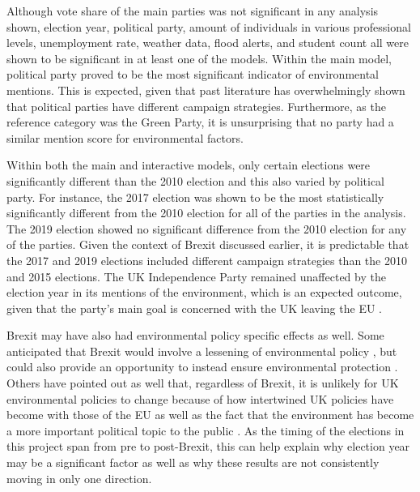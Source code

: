 \documentclass[12pt,letterpaper]{article}
\begin{document}
Although vote share of the main parties was not significant in any analysis shown, election year, political party, amount of individuals in various professional levels, unemployment rate, weather data, flood alerts, and student count all were shown to be significant in at least one of the models. Within the main model, political party proved to be the most significant indicator of environmental mentions. This is expected, given that past literature has overwhelmingly shown that political parties have different campaign strategies. Furthermore, as the reference category was the Green Party, it is unsurprising that no party had a similar mention score for environmental factors. 

Within both the main and interactive models, only certain elections were significantly different than the 2010 election and this also varied by political party. For instance, the 2017 election was shown to be the most statistically significantly different from the 2010 election for all of the parties in the analysis. The 2019 election showed no significant difference from the 2010 election for any of the parties. Given the context of Brexit discussed earlier, it is predictable that the 2017 and 2019 elections included different campaign strategies than the 2010 and 2015 elections. The UK Independence Party remained unaffected by the election year in its mentions of the environment, which is an expected outcome, given that the party's main goal is concerned with the UK leaving the EU \autocite{lynchUKIndependenceParty2012}.

Brexit may have also had environmental policy specific effects as well. Some anticipated that Brexit would involve a lessening of environmental policy \autocite{burnsBrexitUKEnvironmental2018}, but could also provide an opportunity to instead ensure environmental protection \autocite{nwankwoBrexitCriticalJuncture2018}. Others have pointed out as well that, regardless of Brexit, it is unlikely for UK environmental policies to change  because of how intertwined UK policies have become with those of the EU  \autocite{zitoFutureEuropeanUnion2020} as well as the fact that the environment has become a more important political topic to the public \autocite{burnsWillBrexitDegrade2020}. As the timing of the elections in this project span from pre to post-Brexit, this can help explain why election year may be a significant factor as well as why these results are not consistently moving in only one direction.
\end{document}
